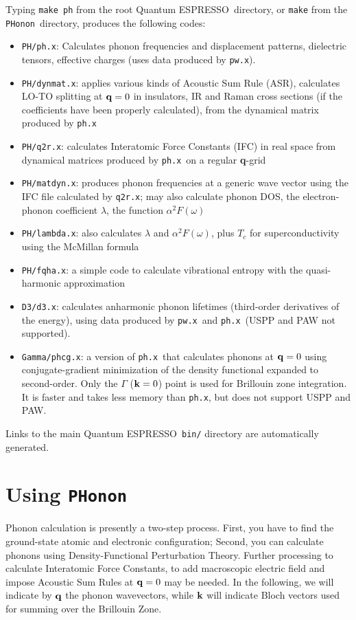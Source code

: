 \documentclass[12pt,a4paper]{article}
\def\qe{{\sc Quantum ESPRESSO}}
\def\pwx{\texttt{pw.x}}
\def\phx{\texttt{ph.x}}
\def\PHonon{\texttt{PHonon}}
\begin{document}
Typing \texttt{make ph} from the root \qe\ directory, or \texttt{make} 
from the \PHonon\ directory, produces the following codes:
\begin{itemize}
  \item \texttt{PH/ph.x}: Calculates phonon frequencies and displacement patterns,
    dielectric tensors, effective charges (uses data produced by \pwx). 
  \item \texttt{PH/dynmat.x}: applies various kinds of Acoustic Sum Rule (ASR),
    calculates LO-TO splitting at ${\bf q} = 0$ in insulators, IR and Raman
    cross sections (if the coefficients have been properly calculated),
    from the dynamical matrix produced by \phx
  \item \texttt{PH/q2r.x}: calculates Interatomic Force Constants (IFC) in real space
    from dynamical matrices produced by \phx\ on a regular {\bf q}-grid 
 \item \texttt{PH/matdyn.x}: produces phonon frequencies at a generic wave vector
    using the IFC file calculated by \texttt{q2r.x}; may also calculate phonon DOS, 
    the electron-phonon coefficient $\lambda$, the function $\alpha^2F(\omega)$
\item \texttt{PH/lambda.x}: also calculates $\lambda$ and $\alpha^2F(\omega)$,
   plus $T_c$ for  superconductivity using the McMillan formula
\item \texttt{PH/fqha.x}: a simple code to calculate vibrational entropy with
   the quasi-harmonic approximation
\item \texttt{D3/d3.x}:
  calculates anharmonic phonon lifetimes (third-order derivatives
  of the energy), using data produced by \pwx\ and \phx\ (USPP 
  and PAW not supported). 
\item \texttt{Gamma/phcg.x}: 
  a version of \phx\ that calculates phonons at ${\bf q} = 0$ using
  conjugate-gradient minimization of the density functional expanded to
  second-order. Only the $\Gamma$ (${\bf k} = 0$) point is used for Brillouin zone
  integration. It is faster and takes less memory than \phx, but does
  not support USPP and PAW.
\end{itemize}
Links to the main \qe\ \texttt{bin/} directory are automatically generated.
   
\section{Using \PHonon}

Phonon calculation is presently a two-step process.
First, you have to find the ground-state atomic and electronic configuration;
Second, you can calculate phonons using Density-Functional Perturbation Theory.
Further processing to calculate Interatomic Force Constants, to add macroscopic
electric field and impose Acoustic Sum Rules at ${\bf q}=0$ may be needed.
In the following, we will indicate by ${\bf q}$ the phonon wavevectors, 
while ${\bf k}$ will indicate Bloch vectors used for summing over the 
Brillouin Zone.
\end{document}
